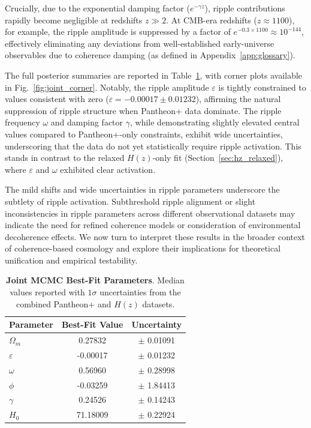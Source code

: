 Crucially, due to the exponential damping factor ($e^{-\gamma z}$), ripple contributions rapidly become negligible at redshifts $z \gg 2$. At CMB-era redshifts ($z \approx 1100$), for example, the ripple amplitude is suppressed by a factor of $e^{-0.3 \times 1100} \approx 10^{-144}$, effectively eliminating any deviations from well-established early-universe observables due to coherence damping (as defined in Appendix~\ref{app:glossary}).

The full posterior summaries are reported in Table~\ref{tab:joint_params}, with corner plots available in Fig.~\ref{fig:joint_corner}. Notably, the ripple amplitude $\varepsilon$ is tightly constrained to values consistent with zero ($\varepsilon = -0.00017 \pm 0.01232$), affirming the natural suppression of ripple structure when Pantheon+ data dominate. The ripple frequency $\omega$ and damping factor $\gamma$, while demonstrating slightly elevated central values compared to Pantheon+-only constraints, exhibit wide uncertainties, underscoring that the data do not yet statistically require ripple activation. This stands in contrast to the relaxed $H(z)$-only fit (Section~\ref{sec:hz_relaxed}), where $\varepsilon$ and $\omega$ exhibited clear activation.

The mild shifts and wide uncertainties in ripple parameters underscore the subtlety of ripple activation. Subthreshold ripple alignment or slight inconsistencies in ripple parameters across different observational datasets may indicate the need for refined coherence models or consideration of environmental decoherence effects. We now turn to interpret these results in the broader context of coherence-based cosmology and explore their implications for theoretical unification and empirical testability.

\begin{table}[htpb]
\centering
\caption{\textbf{Joint MCMC Best-Fit Parameters}. Median values reported with $1\sigma$ uncertainties from the combined Pantheon+ and $H(z)$ datasets.}
\vspace{0.5em}
\begin{tabular}{lcc}
\hline
\textbf{Parameter} & \textbf{Best-Fit Value} & \textbf{Uncertainty} \\
\hline
$\Omega_m$   & 0.27832  & $\pm$ 0.01091 \\
$\varepsilon$ & -0.00017 & $\pm$ 0.01232 \\
$\omega$      & 0.56960  & $\pm$ 0.28998 \\
$\phi$        & -0.03259 & $\pm$ 1.84413 \\
$\gamma$      & 0.24526  & $\pm$ 0.14243 \\
$H_0$         & 71.18009 & $\pm$ 0.22924 \\
\hline
\end{tabular}
\label{tab:joint_params}
\end{table}

